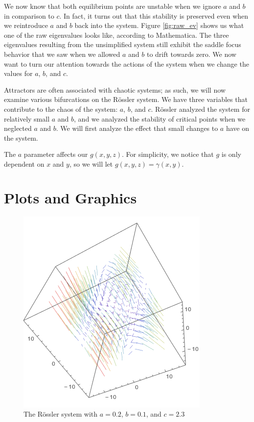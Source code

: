 \documentclass{article}
\begin{document}
We now know that both equilibrium points are unstable when we ignore $a$ and $b$ in comparison to $c$. In fact, it turns out that this stability is preserved even when we reintroduce $a$ and $b$ back into the system. Figure \ref{fig:raw_ev} shows us what one of the raw eigenvalues looks like, according to Mathematica. The three eigenvalues resulting from the unsimplified system still exhibit the saddle focus behavior that we saw when we allowed $a$ and $b$ to drift towards zero. We now want to turn our attention towards the actions of the system when we change the values for $a$, $b$, and $c$.

Attractors are often associated with chaotic systems; as such, we will now examine various bifurcations on the R\"{o}ssler system. We have three variables that contribute to the chaos of the system: $a$, $b$, and $c$. R\"{o}ssler analyzed the system for relatively small $a$ and $b$, and we analyzed the stability of critical points when we neglected $a$ and $b$. We will first analyze the effect that small changes to $a$ have on the system.

The $a$ parameter affects our $g(x,y,z)$. For simplicity, we notice that $g$ is only dependent on $x$ and $y$, so we will let $g(x,y,z)=\gamma(x,y)$.

\newpage
\clearpage
\section*{Plots and Graphics}
\begin{figure}[h]
	\centering
	\includegraphics[scale=0.5]{vp_01.png}
	\caption{The R\"{o}ssler system with $a=0.2$, $b=0.1$, and $c=2.3$}
	\label{fig:3dsys_01}
\end{figure}
\end{document}
